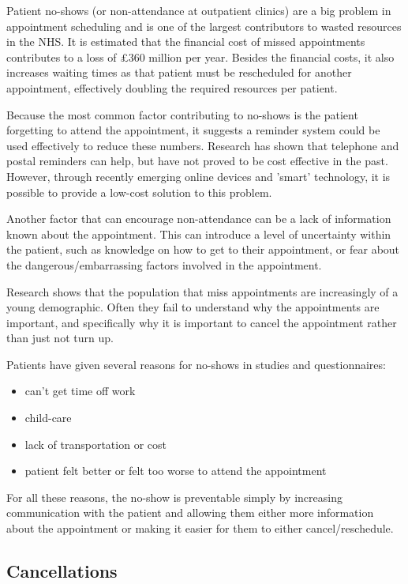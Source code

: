 Patient no-shows (or non-attendance at outpatient clinics) are a big problem in appointment scheduling and is one of the largest contributors to wasted resources in the NHS. It is estimated  that the financial cost of missed appointments contributes to a loss of £360 million per year\cite{Stone}. Besides the financial costs, it also increases waiting times as that patient must be rescheduled for another appointment, effectively doubling the required resources per patient. 

Because the most common factor contributing to no-shows is the patient forgetting to attend the appointment, it suggests a reminder system could be used effectively to reduce these numbers. Research has shown that telephone and postal reminders can help, but have not proved to be cost effective in the past\cite{Mann}. However, through recently emerging online devices and 'smart' technology, it is possible to provide a low-cost solution to this problem.

Another factor that can encourage non-attendance can be a lack of information known about the appointment. This can introduce a level of uncertainty within the patient, such as knowledge on how to get to their appointment, or  fear about the dangerous/embarrassing factors involved in the appointment\cite{Frankel}.

Research shows that the population that miss appointments are increasingly of a young demographic. Often they fail to understand why the appointments are important, and specifically why it is important to cancel the appointment rather than just not turn up.

Patients have given several reasons for no-shows in studies and questionnaires\cite{Lacy}:

\begin{itemize}
	\item can't get time off work
	\item child-care
	\item lack of transportation or cost
	\item patient felt better or felt too worse to attend the appointment
\end{itemize}

For all these reasons, the no-show is preventable simply by increasing communication with the patient and allowing them either more information about the appointment or making it easier for them to either cancel/reschedule.

\subsection{Cancellations}

